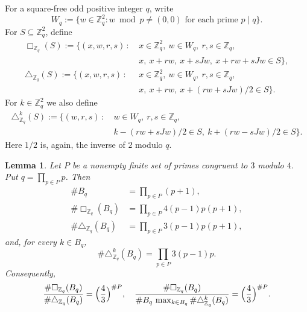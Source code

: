 \documentclass[10pt,a4paper]{amsart}
\newtheorem{lemma}[theorem]{Lemma}
\numberwithin{equation}{section}
\begin{document}
For a square-free odd positive integer $q$, write
\[ W_q:=\{w\in\mathbb{Z}_q^2:
w\bmod p\ne(0,0)\text{ for each prime }p\mid q\}. \]
For $S\subseteq\mathbb{Z}_q^2$, define
\begin{align*}
\Box_{\mathbb{Z}_q}(S):=\{(x,w,r,s) \,:\ &x\in\mathbb{Z}_q^2,
\ w\in W_q,
\ r,s\in\mathbb{Z}_q,\\
&x,\ x+rw,\ x+sJw,\ x+rw+sJw\in S\},\\
\triangle_{\mathbb{Z}_q}(S):=\{(x,w,r,s) \,:\ &x\in\mathbb{Z}_q^2,
\ w\in W_q,
\ r,s\in\mathbb{Z}_q,\\
&x,\ x+rw,\ x+(rw+sJw)/2\in S\}.
\end{align*}
For $k\in\mathbb{Z}_q^2$ we also define
\begin{align*}
\triangle^k_{\mathbb{Z}_q}(S) := \{(w,r,s) \,:\ &w\in W_q,
\ r,s\in\mathbb{Z}_q,\\
& k-(rw+sJw)/2\in S, \ k+(rw-sJw)/2\in S\}.
\end{align*}
Here $1/2$ is, again, the inverse of $2$ modulo $q$.

\begin{lemma}\label{lm:crt}
Let $P$ be a nonempty finite set of primes congruent to $3$ modulo $4$. Put $q=\prod_{p\in P}p$. Then
\begin{align*}
\#B_q & = \prod_{p\in P} (p+1), \\
\#\Box_{\mathbb{Z}_q}(B_q) & = \prod_{p\in P} 4(p-1)p(p+1), \\
\#\triangle_{\mathbb{Z}_q}(B_q) & = \prod_{p\in P} 3(p-1)p(p+1),
\end{align*}
and, for every $k\in B_q$,
\[ \#\triangle^k_{\mathbb{Z}_q}(B_q) = \prod_{p\in P} 3(p-1)p. \]
Consequently,
\[ \frac{\#\Box_{\mathbb{Z}_q}(B_q)}{\#\triangle_{\mathbb{Z}_q}(B_q)} = \Bigl(\frac{4}{3}\Bigr)^{\#P},
\quad \frac{\#\Box_{\mathbb{Z}_q}(B_q)}{\#B_q\,\max_{k\in B_q}\#\triangle^k_{\mathbb{Z}_q}(B_q)} = \Bigl(\frac{4}{3}\Bigr)^{\#P}. \]
\end{lemma}
\end{document}
